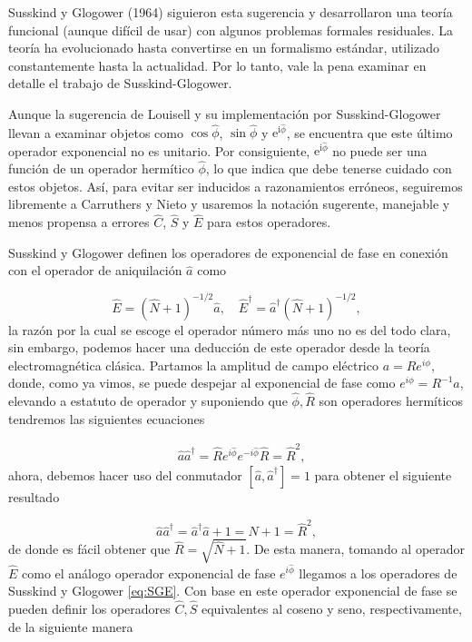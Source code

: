 	    Susskind y Glogower (1964) siguieron esta sugerencia y desarrollaron una teoría funcional (aunque difícil de usar) con algunos problemas formales residuales. La teoría ha evolucionado hasta convertirse en un formalismo estándar, utilizado constantemente hasta la actualidad. Por lo tanto, vale la pena examinar en detalle el trabajo de Susskind-Glogower.
	    
	    Aunque la sugerencia de Louisell y su implementación por Susskind-Glogower llevan a examinar objetos como $\cos\hat{\phi}$, $\sin\hat{\phi}$ y $\mathrm{e}^{\mathrm{i}\hat{\phi}}$, se encuentra que este último operador exponencial no es unitario. Por consiguiente, $\mathrm{e}^{\mathrm{i}\hat{\phi}}$ no puede ser una función de un operador hermítico $\hat{\phi}$, lo que indica que debe tenerse cuidado con estos objetos. Así, para evitar ser inducidos a razonamientos erróneos, seguiremos libremente a Carruthers y Nieto  y usaremos la notación sugerente, manejable y menos propensa a errores $\hat{C}$, $\hat{S}$ y $\hat{E}$ para estos operadores.
	
	    Susskind y Glogower definen los operadores de exponencial de fase en conexión con el operador de aniquilación $\hat{a}$ como
	
	    \begin{equation}\label{eq:SGE}
	        \hat{E} = \left( \hat{N}+1 \right)^{-1/2}\hat{a}, \quad\hat{E}^\dagger = \hat{a}^\dagger \left( \hat{N}+1 \right)^{-1/2},
	    \end{equation}
	    la razón por la cual se escoge el operador número más uno no es del todo clara, sin embargo, podemos hacer una deducción de este operador desde la teoría electromagnética clásica. Partamos la amplitud de campo eléctrico $a = Re^{i\phi}$, donde, como ya vimos, se puede despejar al exponencial de fase como $e^{i\phi}=R^{-1}a$, elevando a estatuto de operador y suponiendo que $\hat{\phi}, \hat{R}$ son operadores hermíticos tendremos las siguientes ecuaciones
	
	    \begin{align}
	        & \hat{a}\hat{a}^\dagger = \hat{R}e^{i\hat{\phi}}e^{-i\hat{\phi}}\hat{R} = \hat{R}^2,
	    \end{align}
	    ahora, debemos hacer uso del conmutador $[\hat{a},\hat{a}^\dagger]=1$ para obtener el siguiente resultado
	
	    \begin{equation}
	        \hat{a}\hat{a}^\dagger= \hat{a}^\dagger\hat{a}
	        +1=\hat{N}+1 = \hat{R}^2, 
	    \end{equation}
	    de donde es fácil obtener que $\hat{R}= \sqrt{\hat{N}+1}$. De esta manera, tomando al operador $\hat{E}$ como el análogo operador exponencial de fase $e^{i\hat{\phi}}$ llegamos a los operadores de Susskind y Glogower \ref{eq:SGE}. Con base en este operador exponencial de fase se pueden definir los operadores $\hat{C},\hat{S}$ equivalentes al coseno y seno, respectivamente, de la siguiente manera
	
